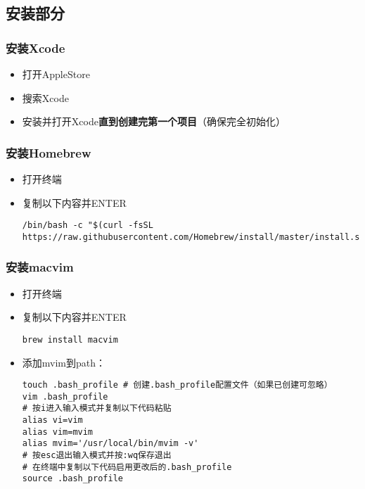 \documentclass[UTF_8]{ctexart}
\begin{document}
\clearpage
\subsection{安装部分}

\small
\heiti
{}

\subsubsection{安装Xcode}

\begin{itemize}
		\item 打开AppleStore
		\item 搜索Xcode
		\item 安装并打开Xcode\textbf{直到创建完第一个项目}（确保完全初始化）
		
\end{itemize}

\subsubsection{安装Homebrew}
\begin{itemize}
		\item 打开终端
		\item 复制以下内容并ENTER

\tiny
\begin{lstlisting}[frame=shadowbox]
/bin/bash -c "$(curl -fsSL https://raw.githubusercontent.com/Homebrew/install/master/install.sh)"
\end{lstlisting}
\end{itemize}

\subsubsection{安装macvim}
\begin{itemize}
		\item 打开终端
		\item 复制以下内容并ENTER
\begin{lstlisting}[frame=shadowbox]
brew install macvim
\end{lstlisting}
\item 添加mvim到path：
\begin{lstlisting}[frame=shadowbox]
touch .bash_profile # 创建.bash_profile配置文件（如果已创建可忽略）
vim .bash_profile
# 按i进入输入模式并复制以下代码粘贴
alias vi=vim
alias vim=mvim
alias mvim='/usr/local/bin/mvim -v'
# 按esc退出输入模式并按:wq保存退出
# 在终端中复制以下代码启用更改后的.bash_profile
source .bash_profile
\end{lstlisting}
\end{itemize}
\end{document}
